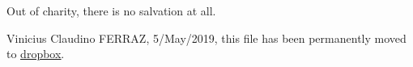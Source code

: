 \documentclass[11pt,a4paper]{article}
\begin{document}
Out of charity, there is no salvation at all.

\vspace{3mm}

Vinicius Claudino FERRAZ, 5/May/2019, this file has been permanently moved to \href{https://www.dropbox.com/s/fxl4hj8kj6934gl/quadric.pdf?dl=0}{\color{blue}\underline{dropbox}}.
\end{document}
